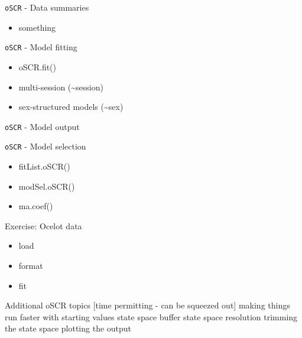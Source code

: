 \begin{frame}{\texttt{oSCR} - Data summaries}

\begin{itemize}[<+->]
\tightlist
\item
  something
\end{itemize}

\end{frame}

\begin{frame}{\texttt{oSCR} - Model fitting}

\begin{itemize}[<+->]
\tightlist
\item
  oSCR.fit()
\item
  multi-session (\textasciitilde{}session)
\item
  sex-structured models (\textasciitilde{}sex)
\end{itemize}

\end{frame}

\begin{frame}{\texttt{oSCR} - Model output}

\end{frame}

\begin{frame}{\texttt{oSCR} - Model selection}

\begin{itemize}[<+->]
\tightlist
\item
  fitList.oSCR()
\item
  modSel.oSCR()
\item
  ma.coef()
\end{itemize}

\end{frame}

\begin{frame}{Exercise: Ocelot data}

\begin{itemize}[<+->]
\tightlist
\item
  load
\item
  format
\item
  fit
\end{itemize}

Additional oSCR topics {[}time permitting - can be squeezed out{]}
making things run faster with starting values state space buffer state
space resolution trimming the state space plotting the output

\end{frame}

